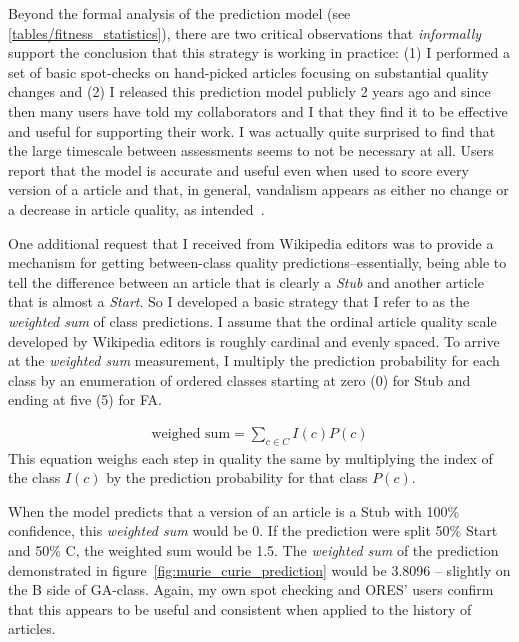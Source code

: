 Beyond the formal analysis of the prediction model (see \ref{tables/fitness_statistics}), there are two critical observations that \emph{informally} support the conclusion that this strategy is working in practice:  (1) I performed a set of basic spot-checks on hand-picked articles focusing on substantial quality changes and (2) I released this prediction model publicly 2 years ago and since then many users have told my collaborators and I that they find it to be effective and useful for supporting their work.  I was actually quite surprised to find that the large timescale between assessments seems to not be necessary at all.  Users report that the model is accurate and useful even when used to score every version of a article and that, in general, vandalism appears as either no change or a decrease in article quality, as intended~\cite{ross2016visualizaing}.

One additional request that I received from Wikipedia editors was to provide a mechanism for getting between-class quality predictions--essentially, being able to tell the difference between an article that is clearly a \emph{Stub} and another article that is almost a \emph{Start}.  So I developed a basic strategy that I refer to as the \emph{weighted sum} of class predictions.  I assume that the ordinal article quality scale developed by Wikipedia editors is roughly cardinal and evenly spaced.  To arrive at the \emph{weighted sum} measurement, I multiply the prediction probability for each class by an enumeration of ordered classes starting at zero (0) for Stub and ending at five (5) for FA.

\begin{equation} \label{eq:weighted_sum}
\begin{split}
\text{weighed sum} = \sum_{c \in C}{I(c)P(c)}
\end{split}
\end{equation}
This equation weighs each step in quality the same by multiplying the index of the class $I(c)$ by the prediction probability for that class $P(c)$.

When the model predicts that a version of an article is a Stub with 100\% confidence, this \emph{weighted sum} would be 0.  If the prediction were split 50\% Start and 50\% C, the weighted sum would be 1.5.  The \emph{weighted sum} of the prediction demonstrated in figure~\ref{fig:murie_curie_prediction} would be 3.8096 -- slightly on the B side of GA-class.  Again, my own spot checking and ORES' users confirm that this appears to be useful and consistent when applied to the history of articles.

